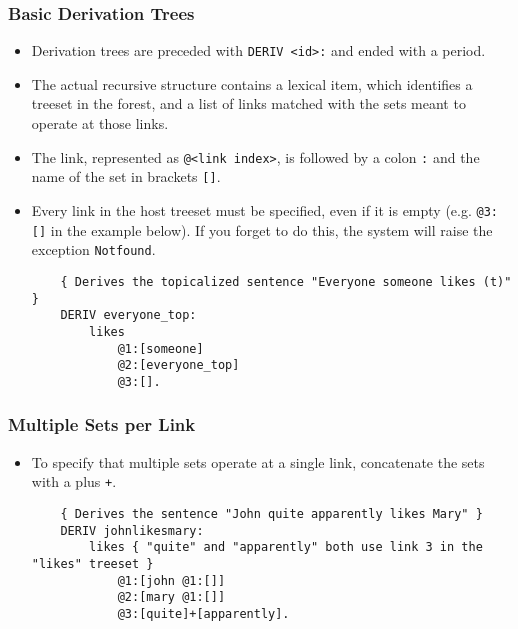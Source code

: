 \documentclass[10.5pt]{article}
\newcommand{\code}[1]{\texttt{#1}}
\begin{document}
\subsubsection{Basic Derivation Trees}
  \begin{itemize}
	\item Derivation trees are preceded with \code{DERIV <id>:} and ended with a period.
	\item The actual recursive structure contains a lexical item, which identifies a treeset in the forest, and a list of links matched with the sets meant to operate at those links.
	\item The link, represented as \code{@<link index>}, is followed by a colon \code{:} and the name of the set in brackets \code{[]}.
	\item Every link in the host treeset must be specified, even if it is empty (e.g. \code{@3:[]} in the example below). If you forget to do this, the system will raise the exception \code{Not\textunderscore found}.
	
	\begin{mdframed}[backgroundcolor=blue!5] 
	\begin{verbatim}
	{ Derives the topicalized sentence "Everyone someone likes (t)" }
	DERIV everyone_top:
	    likes
	        @1:[someone]
	        @2:[everyone_top]
	        @3:[].
	\end{verbatim}
	\end{mdframed}
  \end{itemize}

\subsubsection{Multiple Sets per Link}
  \begin{itemize}
	\item To specify that multiple sets operate at a single link, concatenate the sets with a plus \code{+}.
	
	\begin{mdframed}[backgroundcolor=blue!5] 
	\begin{verbatim}
	{ Derives the sentence "John quite apparently likes Mary" }
	DERIV johnlikesmary:
	    likes { "quite" and "apparently" both use link 3 in the "likes" treeset }
	        @1:[john @1:[]]
	        @2:[mary @1:[]]
	        @3:[quite]+[apparently].
	\end{verbatim}
	\end{mdframed}
  \end{itemize}
\end{document}
